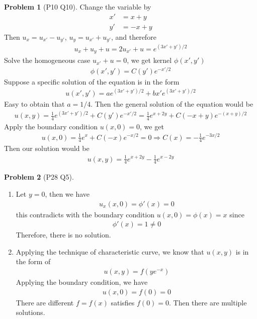 \documentclass[twoside,11pt]{article}
\theoremstyle{definition}
\newtheorem{problem}{Problem}
\theoremstyle{remark}
\begin{document}
\begin{problem}[P10 Q10]
Change the variable by
\begin{align*}
    x' &= x + y\\
    y' &= -x + y
\end{align*}
Then $u_x=u_{x'}-u_{y'}$, $u_y=u_{x'}+u_{y'}$, and therefore
\begin{align*}
    u_x + u_y + u= 2u_{x'} + u = e^{(3x'+y')/2}
\end{align*}
Solve the homogeneous case $u_{x'}+u=0$, we get kernel $\phi(x',y')$
\begin{align*}
    \phi(x',y')=C(y')e^{-x'/2}
\end{align*}
Suppose a specific solution of the equation is in the form 
\begin{align*}
    u(x',y') = ae^{(3x'+y')/2} + bx'e^{(3x'+y')/2}
\end{align*}
Easy to obtain that $a=1/4$.
Then the general solution of the equation would be
\begin{align*}
    u(x,y) = \frac{1}{4}e^{(3x'+y')/2} + C(y')e^{-x'/2}
    =\frac{1}{4}e^{x+2y} + C(-x+y)e^{-(x+y)/2}
\end{align*}
Apply the boundary condition $u(x,0)=0$, we get
\begin{align*}
    u(x,0) = \frac{1}{4}e^{x} + C(-x)e^{-x/2} = 0\Rightarrow
    C(x)=-\frac{1}{4}e^{-3x/2}
\end{align*}
Then our solution would be
\begin{align*}
    u(x,y) = \frac{1}{4}e^{x+2y} - \frac{1}{4}e^{x-2y}
\end{align*}
\end{problem}

\begin{problem}[P28 Q5]\
    \begin{enumerate}[label=(\alph*)]
        \item Let $y=0$, then we have
        \begin{align*}
            u_{x}(x, 0) = \phi'(x) = 0
        \end{align*}
        this contradicts with the boundary condition $u(x,0)=\phi(x)=x$ since
        \begin{align*}
            \phi'(x) = 1 \neq 0
        \end{align*}
        Therefore, there is no solution.

        \item Applying the technique of characteristic curve, we know that
        $u(x,y)$ is in the form of
        \begin{align*}
            u(x, y) = f(ye^{-x})
        \end{align*}
        Applying the boundary condition, we have
        \begin{align*}
            u(x,0) = f(0) = 0
        \end{align*}
        There are different $f=f(x)$ satisfies $f(0)=0$.
        Then there are multiple solutions.
    \end{enumerate}
\end{problem}
\end{document}
